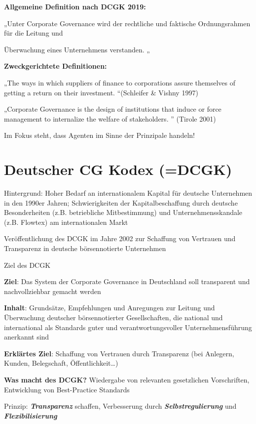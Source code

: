\documentclass[
]{article}
\begin{document}
\textbf{Allgemeine Definition nach DCGK 2019:}

„Unter Corporate Governance wird der rechtliche und faktische
Ordnungsrahmen für die Leitung und

Überwachung eines Unternehmens verstanden. „

\textbf{Zweckgerichtete Definitionen:}

„The ways in which suppliers of finance to corporations assure
themselves of getting a return on their investment. ``(Schleifer \&
Vishny 1997)

„Corporate Governance is the design of institutions that induce or force
management to internalize the welfare of stakeholders. '' (Tirole 2001)

Im Fokus steht, dass Agenten im Sinne der Prinzipale handeln!

\hypertarget{deutscher-cg-kodex-dcgk}{%
\section{Deutscher CG Kodex (=DCGK)}\label{deutscher-cg-kodex-dcgk}}

Hintergrund: Hoher Bedarf an internationalem Kapital für deutsche
Unternehmen in den 1990er Jahren; Schwierigkeiten der Kapitalbeschaffung
durch deutsche Besonderheiten (z.B. betriebliche Mitbestimmung) und
Unternehmensskandale (z.B. Flowtex) am internationalen Markt

Veröffentlichung des DCGK im Jahre 2002 zur Schaffung von Vertrauen und
Transparenz in deutsche börsennotierte Unternehmen

Ziel des DCGK

\textbf{Ziel}: Das System der Corporate Governance in Deutschland soll
transparent und nachvollziehbar gemacht werden

\textbf{Inhalt}: Grundsätze, Empfehlungen und Anregungen zur Leitung und
Überwachung deutscher börsennotierter Gesellschaften, die national und
international als Standards guter und verantwortungsvoller
Unternehmensführung anerkannt sind

\textbf{Erklärtes Ziel}: Schaffung von Vertrauen durch Transparenz (bei
Anlegern, Kunden, Belegschaft, Öffentlichkeit\ldots)

\textbf{Was macht des DCGK?} Wiedergabe von relevanten gesetzlichen
Vorschriften, Entwicklung von Best-Practice Standards

Prinzip: \textbf{\emph{Transparenz}} schaffen, Verbesserung durch
\textbf{\emph{Selbstregulierung}} und \textbf{\emph{Flexibilisierung}}
\end{document}
